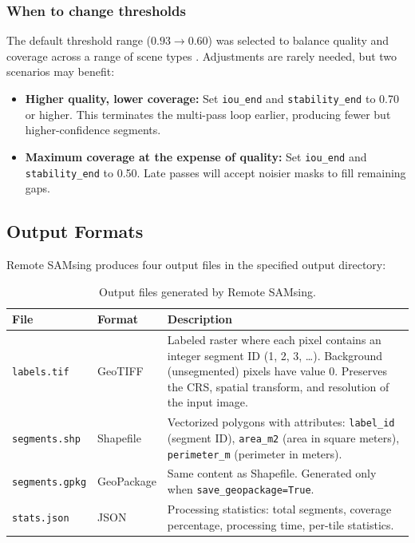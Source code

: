 \documentclass[review,11pt,authoryear]{elsarticle}
\begin{document}
\subsubsection{When to change thresholds}

The default threshold range ($0.93 \to 0.60$) was selected to balance quality and coverage across a range of scene types \citep{carvalho2026jag}. Adjustments are rarely needed, but two scenarios may benefit:
\begin{itemize}
    \item \textbf{Higher quality, lower coverage:} Set \texttt{iou\_end} and \texttt{stability\_end} to 0.70 or higher. This terminates the multi-pass loop earlier, producing fewer but higher-confidence segments.
    \item \textbf{Maximum coverage at the expense of quality:} Set \texttt{iou\_end} and \texttt{stability\_end} to 0.50. Late passes will accept noisier masks to fill remaining gaps.
\end{itemize}


\subsection{Output Formats}
\label{sec:output}

Remote SAMsing produces four output files in the specified output directory:

\begin{table}[htbp]
\centering
\caption{Output files generated by Remote SAMsing.}
\label{tab:outputs}
\begin{tabular}{llp{7cm}}
\toprule
File & Format & Description \\
\midrule
\texttt{labels.tif} & GeoTIFF & Labeled raster where each pixel contains an integer segment ID (1, 2, 3, \ldots). Background (unsegmented) pixels have value 0. Preserves the CRS, spatial transform, and resolution of the input image. \\
\texttt{segments.shp} & Shapefile & Vectorized polygons with attributes: \texttt{label\_id} (segment ID), \texttt{area\_m2} (area in square meters), \texttt{perimeter\_m} (perimeter in meters). \\
\texttt{segments.gpkg} & GeoPackage & Same content as Shapefile. Generated only when \texttt{save\_geopackage=True}. \\
\texttt{stats.json} & JSON & Processing statistics: total segments, coverage percentage, processing time, per-tile statistics. \\
\bottomrule
\end{tabular}
\end{table}
\end{document}
